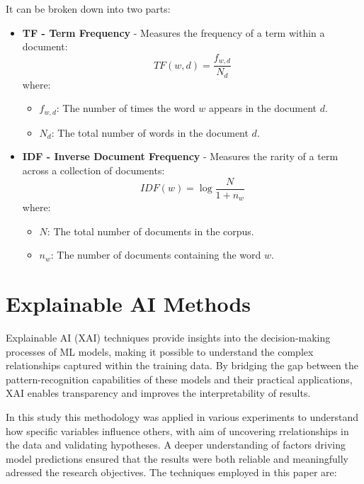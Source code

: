 It can be broken down into two parts:


\begin{itemize}
  \item \textbf{TF - Term Frequency} - Measures the frequency of a term within
    a document:
  \[
  TF(w, d) = \frac{f_{w, d}}{N_d}
  \]
  where:
  \begin{itemize}
    \item \( f_{w, d} \): The number of times the word \( w \) appears in the document \( d \).
    \item \( N_d \): The total number of words in the document \( d \).
  \end{itemize}

  \item \textbf{IDF - Inverse Document Frequency} - Measures the rarity of a
    term across a collection of documents:
  \[
  IDF(w) = \log{\frac{N}{1 + n_w}}
  \]
  where:
  \begin{itemize}
    \item \( N \): The total number of documents in the corpus.
    \item \( n_w \): The number of documents containing the word \( w \).
  \end{itemize}
\end{itemize}


\section{Explainable AI Methods}
\label{sec:explainableaimethods}


Explainable AI (XAI) techniques provide insights into the decision-making
processes of ML models, making it possible to understand the complex
relationships captured within the training data. By bridging the gap between
the pattern-recognition capabilities of these models and their practical
applications, XAI enables transparency and improves the interpretability of
results.

In this study this methodology was applied in various experiments to understand
how specific variables influence others, with aim of uncovering rrelationships
in the data and validating hypotheses. A deeper  understanding of factors
driving model predictions ensured that the results were both reliable and
meaningfully adressed the research objectives. The  techniques employed in this paper are: 

